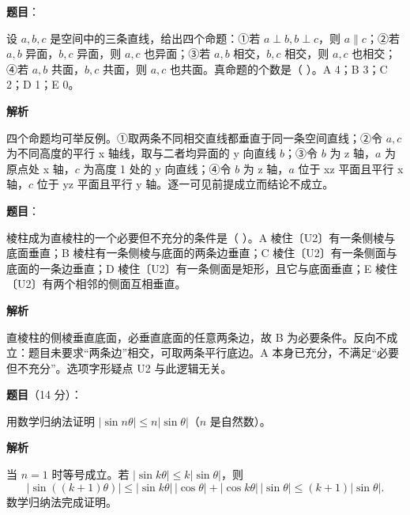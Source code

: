 \begin{answer}

\textbf{题目}：

设 $a,b,c$ 是空间中的三条直线，给出四个命题：①若 $a\perp b,b\perp c$，则 $a\parallel c$；②若 $a,b$ 异面，$b,c$ 异面，则 $a,c$ 也异面；③若 $a,b$ 相交，$b,c$ 相交，则 $a,c$ 也相交；④若 $a,b$ 共面，$b,c$ 共面，则 $a,c$ 也共面。真命题的个数是（ ）。A 4；B 3；C 2；D 1；E 0。

\textbf{解析}

四个命题均可举反例。①取两条不同相交直线都垂直于同一条空间直线；②令 $a,c$ 为不同高度的平行 x 轴线，取与二者均异面的 y 向直线 $b$；③令 $b$ 为 z 轴，$a$ 为原点处 x 轴，$c$ 为高度 1 处的 y 向直线；④令 $b$ 为 z 轴，$a$ 位于 xz 平面且平行 x 轴，$c$ 位于 yz 平面且平行 y 轴。逐一可见前提成立而结论不成立。


\end{answer}
\begin{answer}

\textbf{题目}：

棱柱成为直棱柱的一个必要但不充分的条件是（ ）。A 棱住〔U2〕有一条侧棱与底面垂直；B 棱柱有一条侧棱与底面的两条边垂直；C 棱住〔U2〕有一条侧面与底面的一条边垂直；D 棱住〔U2〕有一条侧面是矩形，且它与底面垂直；E 棱住〔U2〕有两个相邻的侧面互相垂直。

\textbf{解析}

直棱柱的侧棱垂直底面，必垂直底面的任意两条边，故 B 为必要条件。反向不成立：题目未要求“两条边”相交，可取两条平行底边。A 本身已充分，不满足“必要但不充分”。选项字形疑点 U2 与此逻辑无关。


\end{answer}
\begin{answer}

\textbf{题目}（14 分）：

用数学归纳法证明 $|\sin n\theta|\leq n|\sin\theta|$（$n$ 是自然数）。

\textbf{解析}

当 $n=1$ 时等号成立。若 $|\sin k\theta|\le k|\sin\theta|$，则
\nopagebreak[4]
\[
|\sin((k+1)\theta)|\le|\sin k\theta|\,|\cos\theta|+|\cos k\theta|\,|\sin\theta|
\le(k+1)|\sin\theta|.
\]
数学归纳法完成证明。


\end{answer}
